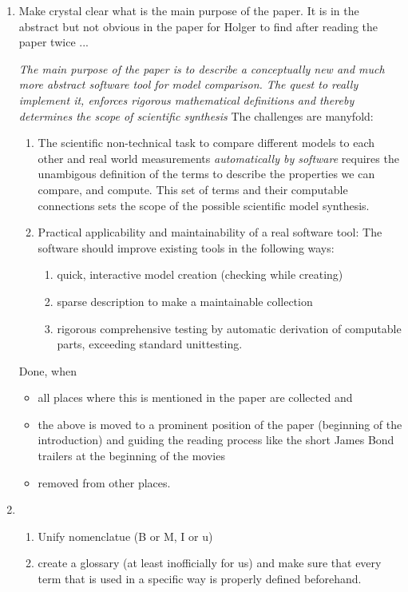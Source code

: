 \begin{enumerate}
\item
  Make crystal clear what is the main purpose of the paper.
  It is in the abstract but not obvious in the paper for Holger to find after reading the paper twice ...
  
  \emph{The main purpose of the paper is to describe a conceptually new and much more abstract software tool for model comparison.
  The quest to really implement it, enforces rigorous mathematical definitions and thereby determines the scope of scientific synthesis}
  The challenges are manyfold: 
  \begin{enumerate}
    \item 
    The scientific non-technical task to compare different models to each other and real world measurements \emph{automatically by software} requires the unambigous definition of the terms to describe the properties we can compare, and compute.
    This set of terms and their computable connections sets the scope of the possible scientific model synthesis.
    \item 
     Practical applicability and maintainability of a real software tool:
    The software should improve existing tools in the following ways:
    \begin{enumerate}
      \item
      quick, interactive model creation (checking while creating)
      \item
      sparse description to make a maintainable collection 
      \item
      rigorous comprehensive testing by automatic derivation of computable parts, exceeding standard unittesting. 
    \end{enumerate}
  \end{enumerate}
  Done, when
  \begin{itemize}
    \item
    all places where this is mentioned in the paper are collected and
    \item
    the above is moved to a prominent position of the paper 
    (beginning of the introduction) and guiding the reading process
    like the short James Bond trailers at the beginning of the movies
    \item
    removed from other places.
  \end{itemize}
 \item 
  \begin{enumerate}
  \item
    Unify nomenclatue (B or M, I or u) 
  \item
    create a glossary (at least inofficially for us)  and make sure that every term  that is used in a specific way is properly defined beforehand.


\end{enumerate}
\end{enumerate}

